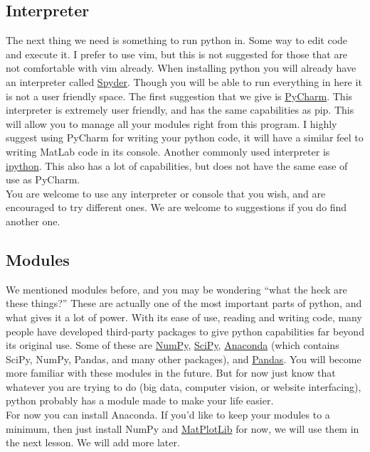 \documentclass[11pt]{article}   %
\begin{document}
\subsection*{Interpreter}
The next thing we need is something to run python in.  Some way to edit code and execute it.  I prefer to use vim, but this is not suggested for those that are not comfortable with vim already.
When installing python you will already have an interpreter called \href{https://pythonhosted.org/spyder/console.html}{Spyder}.  Though you will be able to run everything in here
it is not a user friendly space.  The first suggestion that we give is \href{http://www.jetbrains.com/pycharm/download/}{PyCharm}.  This interpreter is extremely user friendly, and 
has the same capabilities as pip.  This will allow you to manage all your modules right from this program.  I highly suggest using PyCharm for writing your python code, it will have a
similar feel to writing MatLab code in its console.  Another commonly used interpreter is \href{http://ipython.org/install.html}{ipython}.  This also has a lot of capabilities, but does 
not have the same ease of use as PyCharm.\\
You are welcome to use any interpreter or console that you wish, and are encouraged to try different ones.  We are welcome to suggestions if you do find another one.

\subsection*{Modules}
We mentioned modules before, and you may be wondering ``what the heck are these things?''  These are actually one of the most important parts of python, and what gives it a lot of power.
With its ease of use, reading and writing code, many people have developed third-party packages to give python capabilities far beyond its original use.  Some of these are \href{http://www.numpy.org/}{NumPy},
\href{http://www.scipy.org/}{SciPy}, \href{http://docs.continuum.io/anaconda/}{Anaconda} (which contains SciPy, NumPy, Pandas, and many other packages), and \href{http://pandas.pydata.org/}{Pandas}.
You will become more familiar with these modules in the future.  But for now just know that whatever you are trying to do (big data, computer vision, or website interfacing), python
probably has a module made to make your life easier.
\\
For now you can install Anaconda.  If you'd like to keep your modules to a minimum, then just install NumPy and \href{http://matplotlib.org/}{MatPlotLib} for now, we will use them in the next lesson. We will add more later.
\end{document}
